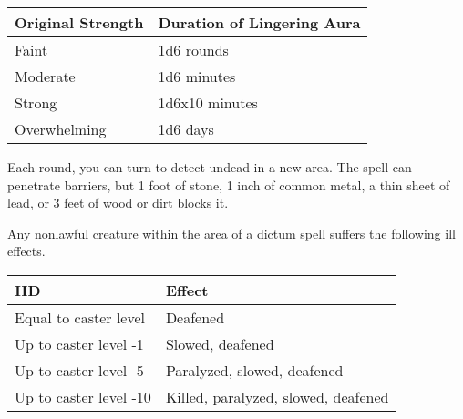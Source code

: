 \begin{multicols}{2}
\begin{small}

\begin{center}
\begin{tabular}[h!]{l|l} 
Original Strength & Duration of Lingering Aura \\ \hline
Faint & 1d6 rounds \\
Moderate & 1d6 minutes \\
Strong & 1d6x10 minutes	\\
Overwhelming & 1d6 days \\
\end{tabular}
\end{center}

\smallskip\noindent Each round, you can turn to detect undead in a new area. The spell can penetrate barriers, but 1 foot of stone, 1 inch of common metal, a thin sheet of lead, or 3 feet of wood or dirt blocks it.


\noindent Any nonlawful creature within the area of a dictum spell suffers the following ill effects.

\begin{center}
\begin{tabular}[h!]{l|p{1.5in}}
HD & Effect	\\ \hline
Equal to caster level & Deafened \\
Up to caster level -1 & Slowed, deafened \\
Up to caster level -5 & Paralyzed, slowed, deafened \\
Up to caster level -10 & Killed, paralyzed, slowed, deafened \\
\end{tabular}
\end{center}


\end{small}
\end{multicols}
